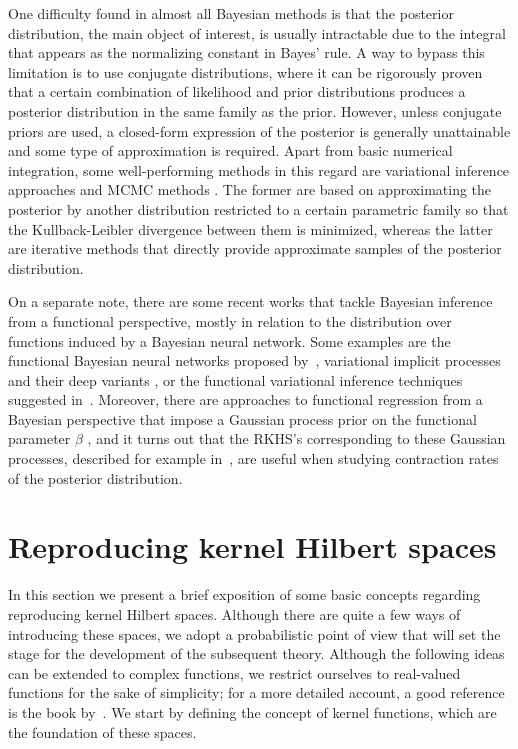 One difficulty found in almost all Bayesian methods is that the posterior distribution, the main object of interest, is usually intractable due to the integral that appears as the normalizing constant in Bayes' rule. A way to bypass this limitation is to use conjugate distributions, where it can be rigorously proven that a certain combination of likelihood and prior distributions produces a posterior distribution in the same family as the prior. However, unless conjugate priors are used, a closed-form expression of the posterior is generally unattainable and some type of approximation is required. Apart from basic numerical integration, some well-performing methods in this regard are variational inference approaches \citep[e.g.][]{blei2017variational} and MCMC methods \citep[e.g.][]{brooks2011handbook}. The former are based on approximating the posterior by another distribution restricted to a certain parametric family so that the Kullback-Leibler divergence between them is minimized, whereas the latter are iterative methods that directly provide approximate samples of the posterior distribution.

On a separate note, there are some recent works that tackle Bayesian inference from a functional perspective, mostly in relation to the distribution over functions induced by a Bayesian neural network. Some examples are the functional Bayesian neural networks proposed by~\citet{sun2019functional}, variational implicit processes \citep{ma2019variational} and their deep variants \citep{ortega2022deep}, or the functional variational inference techniques suggested in~\citet{ma2021functional}. Moreover, there are approaches to functional regression from a Bayesian perspective that impose a Gaussian process prior on the functional parameter \(\beta\) \citep[e.g][]{lian2016posterior}, and it turns out that the RKHS's corresponding to these Gaussian processes, described for example in~\citet{van2008reproducing}, are useful when studying contraction rates of the posterior distribution.

\section{Reproducing kernel Hilbert spaces}\label{sec:rkhs}

In this section we present a brief exposition of some basic concepts regarding reproducing kernel Hilbert spaces. Although there are quite a few ways of introducing these spaces, we adopt a probabilistic point of view that will set the stage for the development of the subsequent theory. Although the following ideas can be extended to complex functions, we restrict ourselves to real-valued functions for the sake of simplicity; for a more detailed account, a good reference is the book by~\citet{berlinet2004reproducing}. We start by defining the concept of kernel functions, which are the foundation of these spaces.

